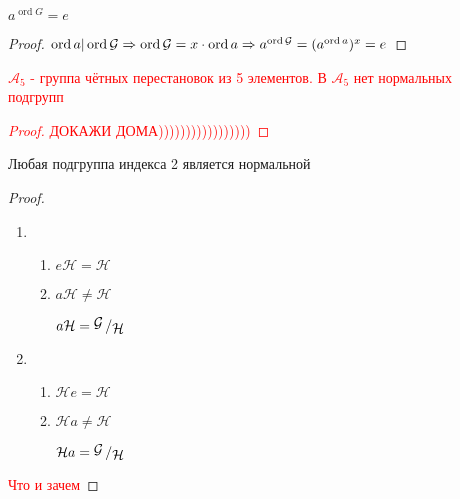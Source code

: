 \documentclass[../main/document.tex]{subfiles}
\begin{document}
\begin{thm}\label{power-order-of-group}
$a^{\operatorname{ord}G}=e$
\begin{proof}
$\operatorname{ord} a| \operatorname{ord} \mathcal{G}\Rightarrow \operatorname{ord} \mathcal{G}=x\cdot\operatorname{ord} a\Rightarrow a^{\operatorname{ord} \mathcal{G}}=(a^{\operatorname{ord} a})^x=e$

\end{proof}
\end{thm}
\textcolor{red}{
\begin{exm}
$\mathcal{A}_5$ - группа чётных перестановок из 5 элементов. В $\mathcal{A}_5$ нет нормальных подгрупп
\begin{proof}
ДОКАЖИ ДОМА)))))))))))))))))
\end{proof}
\end{exm}}


\begin{thm}
Любая подгруппа индекса 2 является нормальной
\begin{proof}
\begin{enumerate}
\item \begin{enumerate}
\item $e\mathcal{H}=\mathcal{H}$
\item $a\mathcal{H}\neq\mathcal{H}$

$a\mathcal{H}=\bigslant{\mathcal{G}}{\mathcal{H}}$
\end{enumerate}
\item \begin{enumerate}
\item $\mathcal{H}e=\mathcal{H}$
\item $\mathcal{H}a\neq\mathcal{H}$

$\mathcal{H}a=\bigslant{\mathcal{G}}{\mathcal{H}}$
\end{enumerate}
\end{enumerate}
\textcolor{red}{Что и зачем}
\end{proof}
\end{thm}
\end{document}
